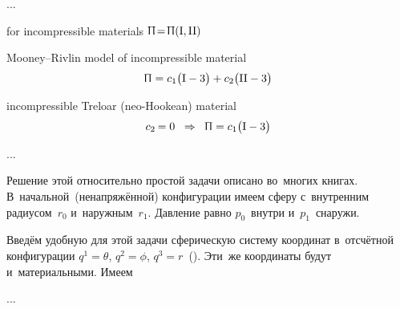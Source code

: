 ...



for incompressible materials
${\Uppi \hspace{-0.4ex} = \hspace{-0.33ex} \Uppi (\mathrm{I}, \mathrm{II})}$

Mooney\hbox{--}Rivlin model of incompressible material
\[
\Uppi = c_1 \bigl( \mathrm{I} - 3 \bigr) + c_2 \bigl( \mathrm{II} - 3 \bigr)
\]

incompressible Treloar (neo-Hookean) material
\[
c_2 \hspace{-0.16ex} = 0
\;\;\Rightarrow\;\;
\Uppi = c_1 \bigl( \mathrm{I} - 3 \bigr)
\]


...





\label{section:hollowsphereunderpressure}

\begin{otherlanguage}{russian}

Решение этой относительно простой задачи описано во~многих книгах.
В~начальной~(ненапряжённой) конфигурации имеем сферу с~внутренним радиусом~${r_0}$ и~наружным~${r_1}$.
Давление равно $p_0$~внутри и~$p_1$~снаружи.

Введём удобную для этой задачи сферическую систему координат в~отсчётной конфигурации ${q^1 = \theta}$, ${q^2 = \phi}$, ${q^3 = r}$~().
Эти~же координаты будут и~материальными.
Имеем

...

\end{otherlanguage}

\newpage





